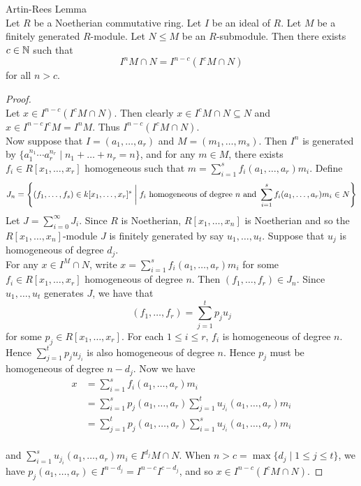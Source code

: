 \documentclass[a4paper]{article}
\begin{document}
\begin{thm}{Artin-Rees Lemma}{}\\
Let $R$ be a Noetherian commutative ring. Let $I$ be an ideal of $R$. Let $M$ be a finitely generated $R$-module. Let $N\leq M$ be an $R$-submodule. Then there exists $c\in\mathbb{N}$ such that $$I^nM\cap N=I^{n-c}(I^cM\cap N)$$ for all $n>c$. 
\begin{proof}\\
Let $x\in I^{n-c}(I^cM\cap N)$. Then clearly $x\in I^cM\cap N\subseteq N$ and $x\in I^{n-c}I^cM=I^nM$. Thus $I^{n-c}(I^cM\cap N)$. \\

Now suppose that $I=(a_1,\dots,a_r)$ and $M=(m_1,\dots,m_s)$. Then $I^n$ is generated by $\{a_1^{n_1}\cdots a_r^{n_r}\;|\;n_1+\dots+n_r=n\}$, and for any $m\in M$, there exists $f_i\in R[x_1,\dots,x_r]$ homogeneous such that $m=\sum_{i=1}^sf_i(a_1,\dots,a_r)m_i$. Define $$J_n=\left\{(f_1,\dots,f_s)\in k[x_1,\dots,x_r]^s\;\bigg{|}\;f_i\text{ homogeneous of degree }n\text{ and }\sum_{i=1}^sf_i(a_1,\dots,a_r)m_i\in N\right\}$$ Let $J=\sum_{i=0}^\infty J_i$. Since $R$ is Noetherian, $R[x_1,\dots,x_n]$ is Noetherian and so the $R[x_1,\dots,x_n]$-module $J$ is finitely generated by say $u_1,\dots,u_t$. Suppose that $u_j$ is homogeneous of degree $d_j$. \\

For any $x\in I^M\cap N$, write $x=\sum_{i=1}^sf_i(a_1,\dots,a_r)m_i$ for some $f_i\in R[x_1,\dots,x_r]$ homogeneous of degree $n$. Then $(f_1,\dots,f_r)\in J_n$. Since $u_1,\dots,u_t$ generates $J$, we have that $$(f_1,\dots,f_r)=\sum_{j=1}^tp_ju_j$$ for some $p_j\in R[x_1,\dots,x_r]$. For each $1\leq i\leq r$, $f_i$ is homogeneous of degree $n$. Hence $\sum_{j=1}^tp_ju_{j_i}$ is also homogeneous of degree $n$. Hence $p_j$ must be homogeneous of degree $n-d_j$. Now we have 
\begin{align*}
x&=\sum_{i=1}^sf_i(a_1,\dots,a_r)m_i\\
&=\sum_{i=1}^sp_j(a_1,\dots,a_r)\sum_{j=1}^tu_{j_i}(a_1,\dots,a_r)m_i\\
&=\sum_{j=1}^tp_j(a_1,\dots,a_r)\sum_{i=1}^su_{j_i}(a_1,\dots,a_r)m_i
\end{align*}\\
and $\sum_{i=1}^su_{j_i}(a_1,\dots,a_r)m_i\in I^{d_j}M\cap N$. When $n>c=\max\{d_j\;|\;1\leq j\leq t\}$, we have $p_j(a_1,\dots,a_r)\in I^{n-d_j}=I^{n-c}I^{c-d_j}$, and so $x\in I^{n-c}(I^cM\cap N)$. 
\end{proof}
\end{thm}
\end{document}
